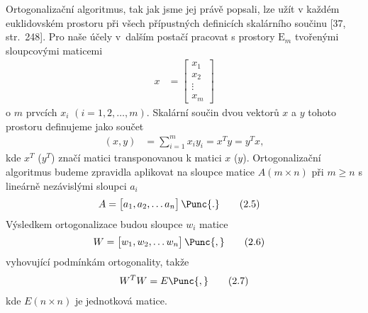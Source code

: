 Ortogonalizační algoritmus, tak jak jsme jej právě popsali, lze užít v
každém euklidovském prostoru při všech přípustných definicích
skalárního součinu [37, str.\ 248]. Pro naše účely v~dalším postačí
pracovat s prostory $\mathrm{E}_m$ tvořenými sloupcovými maticemi
%
\begin{align*}
   x &= \begin{bmatrix} x_1 \\ x_2 \\ \vdots \\ x_m
        \end{bmatrix}                                           \tag{2.3}
\end{align*}
%
o $m$ prvcích $x_i$ $(i=1,2,\ldots,m)$. Skalární součin dvou vektorů
$x$ a $y$ tohoto prostoru definujeme jako součet
%
\begin{align*}
   (x, y) &= \sum_{i=1}^m x_iy_i = x^Ty = y^Tx,                 \tag{2.4}
\end{align*}
%
kde $x^T$ ($y^T$) značí matici transponovanou k matici $x$
($y$). Ortogonalizační algoritmus budeme zpravidla aplikovat na
sloupce matice $A(m \times n)$ při $m \ge n$ s lineárně nezávislými
sloupci $a_i$
%
\begin{align*}
   A &= \begin{bmatrix} a_1, a_2, \ldots a_n \end{bmatrix} \Punc{.}     \tag{2.5}
\end{align*}
%
Výsledkem ortogonalizace budou sloupce $w_i$ matice
%
\begin{align*}
   W &= \begin{bmatrix} w_1, w_2, \ldots w_n \end{bmatrix} \Punc{,}     \tag{2.6}
\end{align*}
%
%
vyhovující podmínkám ortogonality, takže
%
\begin{align*}
   W^TW = E \Punc{,}                                                    \tag{2.7}
\end{align*}
%
kde $E(n \times n)$ je jednotková matice.
%


